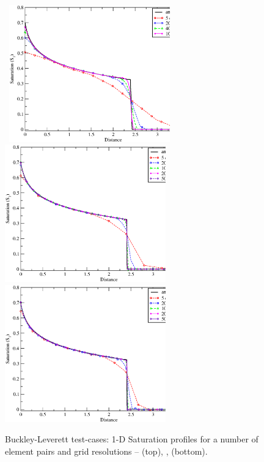 \begin{figure}[h]
\vbox{\hbox{\hspace{2.5cm}
    \includegraphics[width=0.62\textwidth]{BL_1d_P0DGP1_convergence.eps}}
\vspace{-.0cm}\hbox{\hspace{2.5cm}
    \includegraphics[width=0.62\textwidth]{BL_1d_P1DGP2_convergence.eps}}
\vspace{-.0cm}\hbox{\hspace{2.5cm}
    \includegraphics[width=0.62\textwidth]{BL_1d_P2DGP3_convergence.eps}}}
    \caption{Buckley-Leverett test-cases: 1-D Saturation profiles for a number of element pairs and grid resolutions --  (top), ,  (bottom).\label{fig:BL_profiles}}
\end{figure}

